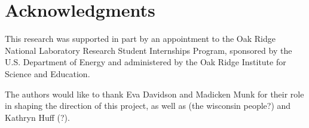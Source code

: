 \documentclass{anstrans}
\renewcommand{\vec}[1]{\bm{#1}} %
\newcommand{\vd}{\bm{\cdot}} %
\newcommand{\grad}{\vec{\nabla}} %
\newcommand{\ud}{\mathop{}\!\mathrm{d}} %
\begin{document}
\section{Acknowledgments}

This research was supported in part by an appointment to the Oak Ridge National Laboratory Research Student Internships Program, sponsored by the U.S. Department of Energy and administered by the Oak Ridge Institute for Science and Education.

The authors would like to thank Eva Davidson and Madicken Munk for their role
in shaping the direction of this project, as well as (the wisconsin people?) and Kathryn Huff (?).



\printglossary[type=\acronymtype]
\printglossary




\end{document}
